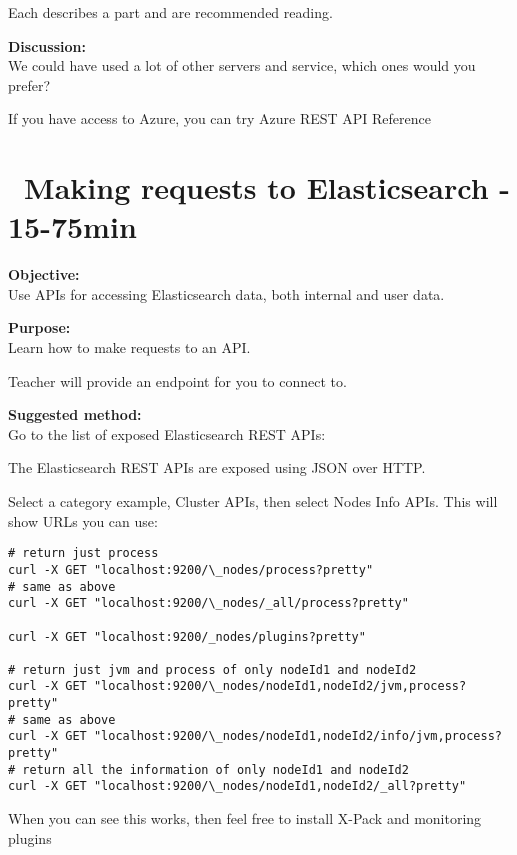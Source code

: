 \documentclass[a4paper,11pt,notitlepage]{report}
\begin{document}
Each describes a part and are recommended reading.

{\bf Discussion:}\\
We could have used a lot of other servers and service, which ones would you prefer?

If you have access to Azure, you can try Azure REST API Reference\\ 

\chapter{\faInfoCircle\ Making requests to Elasticsearch - 15-75min}
\label{ex:es-rest-api}


{\bf Objective:}\\
Use APIs for accessing Elasticsearch data, both internal and user data.

{\bf Purpose:}\\
Learn how to make requests to an API.

Teacher will provide an endpoint for you to connect to.

{\bf Suggested method:}\\
Go to the list of exposed Elasticsearch REST APIs:\\

The Elasticsearch REST APIs are exposed using JSON over HTTP.

Select a category example, Cluster APIs, then select Nodes Info APIs. This will show URLs you can use:

\begin{verbatim}
# return just process
curl -X GET "localhost:9200/\_nodes/process?pretty"
# same as above
curl -X GET "localhost:9200/\_nodes/_all/process?pretty"

curl -X GET "localhost:9200/_nodes/plugins?pretty"

# return just jvm and process of only nodeId1 and nodeId2
curl -X GET "localhost:9200/\_nodes/nodeId1,nodeId2/jvm,process?pretty"
# same as above
curl -X GET "localhost:9200/\_nodes/nodeId1,nodeId2/info/jvm,process?pretty"
# return all the information of only nodeId1 and nodeId2
curl -X GET "localhost:9200/\_nodes/nodeId1,nodeId2/_all?pretty"
\end{verbatim}

When you can see this works, then feel free to install X-Pack and monitoring plugins
\end{document}
